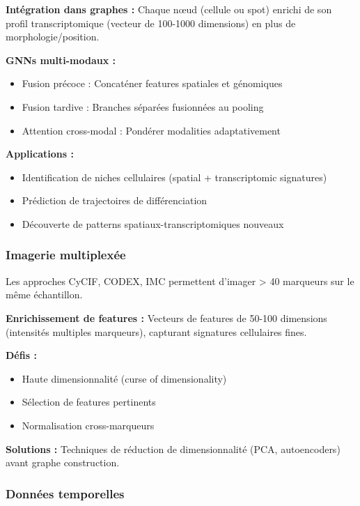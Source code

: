 \textbf{Intégration dans graphes :}
Chaque nœud (cellule ou spot) enrichi de son profil transcriptomique (vecteur de 100-1000 dimensions) en plus de morphologie/position.

\textbf{GNNs multi-modaux :}
\begin{itemize}
    \item Fusion précoce : Concaténer features spatiales et génomiques
    \item Fusion tardive : Branches séparées fusionnées au pooling
    \item Attention cross-modal : Pondérer modalities adaptativement
\end{itemize}

\textbf{Applications :}
\begin{itemize}
    \item Identification de niches cellulaires (spatial + transcriptomic signatures)
    \item Prédiction de trajectoires de différenciation
    \item Découverte de patterns spatiaux-transcriptomiques nouveaux
\end{itemize}

\subsubsection{Imagerie multiplexée}

Les approches CyCIF, CODEX, IMC permettent d'imager > 40 marqueurs sur le même échantillon.

\textbf{Enrichissement de features :}
Vecteurs de features de 50-100 dimensions (intensités multiples marqueurs), capturant signatures cellulaires fines.

\textbf{Défis :}
\begin{itemize}
    \item Haute dimensionnalité (curse of dimensionality)
    \item Sélection de features pertinents
    \item Normalisation cross-marqueurs
\end{itemize}

\textbf{Solutions :}
Techniques de réduction de dimensionnalité (PCA, autoencoders) avant graphe construction.

\subsubsection{Données temporelles}

